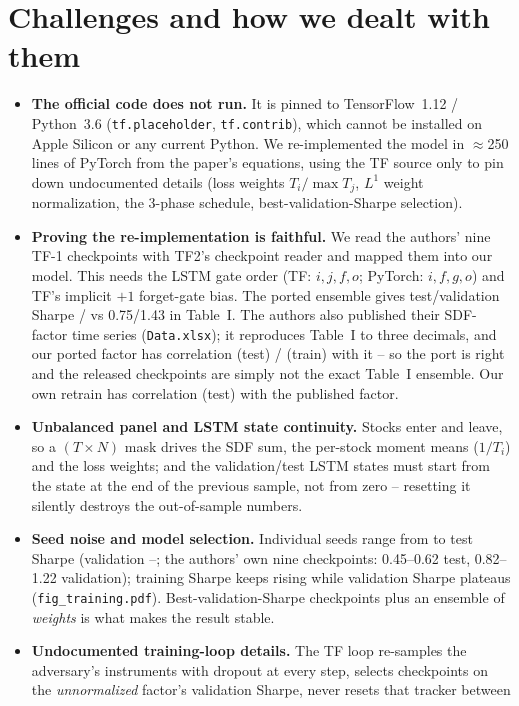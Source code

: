 \documentclass[10pt]{article}
\begin{document}
\section{Challenges and how we dealt with them}
\begin{itemize}
\item \textbf{The official code does not run.} It is pinned to TensorFlow~1.12 / Python~3.6 (\texttt{tf.placeholder},
\texttt{tf.contrib}), which cannot be installed on Apple Silicon or any current Python. We re-implemented the model in
$\approx$250 lines of PyTorch from the paper's equations, using the TF source only to pin down undocumented details
(loss weights $T_i/\max T_j$, $L^1$ weight normalization, the 3-phase schedule, best-validation-Sharpe selection).
\item \textbf{Proving the re-implementation is faithful.} We read the authors' nine TF-1 checkpoints with TF2's
checkpoint reader and mapped them into our model. This needs the LSTM gate order (TF: $i,j,f,o$; PyTorch: $i,f,g,o$)
and TF's implicit $+1$ forget-gate bias. The ported ensemble gives test/validation Sharpe \authSRTe/\authSRVa{} vs
0.75/1.43 in Table~I. The authors also published their SDF-factor time series (\texttt{Data.xlsx}); it reproduces
Table~I to three decimals, and our ported factor has correlation \corrPortTe{} (test) / \corrPortTr{} (train) with it --
so the port is right and the released checkpoints are simply not the exact Table~I ensemble. Our own retrain has
correlation \corrOursTe{} (test) with the published factor.
\item \textbf{Unbalanced panel and LSTM state continuity.} Stocks enter and leave, so a $(T\times N)$ mask drives the SDF
sum, the per-stock moment means ($1/T_i$) and the loss weights; and the validation/test LSTM states must start from the
state at the end of the previous sample, not from zero -- resetting it silently destroys the out-of-sample numbers.
\item \textbf{Seed noise and model selection.} Individual seeds range from \trialTeMin{} to \trialTeMax{} test Sharpe
(validation \trialVaMin--\trialVaMax; the authors' own nine checkpoints: 0.45--0.62 test, 0.82--1.22 validation);
training Sharpe keeps rising while validation Sharpe plateaus (\texttt{fig\_training.pdf}). Best-validation-Sharpe
checkpoints plus an ensemble of \emph{weights} is what makes the result stable.
\item \textbf{Undocumented training-loop details.} The TF loop re-samples the adversary's instruments with dropout at
every step, selects checkpoints on the \emph{unnormalized} factor's validation Sharpe, never resets that tracker between

\end{itemize}
\end{document}
